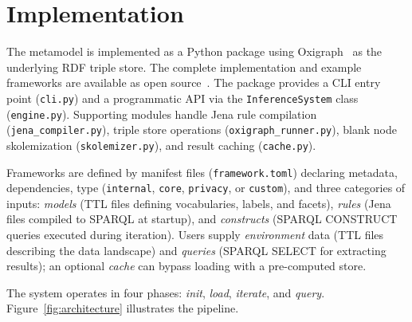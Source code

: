 \documentclass[runningheads,oneside]{llncs}
\begin{document}
\section{Implementation}\label{sec:implementation}

The metamodel is implemented as a Python package using Oxigraph~\cite{oxigraph} as the underlying RDF triple store. The complete implementation and example frameworks are available as open source~\cite{parajudica}. The package provides a CLI entry point ({\footnotesize\texttt{cli.py}}) and a programmatic API via the {\footnotesize\texttt{InferenceSystem}} class ({\footnotesize\texttt{engine.py}}). Supporting modules handle Jena rule compilation ({\footnotesize\texttt{jena\_compiler.py}}), triple store operations ({\footnotesize\texttt{oxigraph\_runner.py}}), blank node skolemization ({\footnotesize\texttt{skolemizer.py}}), and result caching ({\footnotesize\texttt{cache.py}}).

Frameworks are defined by manifest files ({\footnotesize\texttt{framework.toml}}) declaring metadata, dependencies, type ({\footnotesize\texttt{internal}}, {\footnotesize\texttt{core}}, {\footnotesize\texttt{privacy}}, or {\footnotesize\texttt{custom}}), and three categories of inputs: \emph{models} (TTL files defining vocabularies, labels, and facets), \emph{rules} (Jena files compiled to SPARQL at startup), and \emph{constructs} (SPARQL CONSTRUCT queries executed during iteration). Users supply \emph{environment} data (TTL files describing the data landscape) and \emph{queries} (SPARQL SELECT for extracting results); an optional \emph{cache} can bypass loading with a pre-computed store.

The system operates in four phases: \emph{init}, \emph{load}, \emph{iterate}, and \emph{query}. Figure~\ref{fig:architecture} illustrates the pipeline.
\end{document}
